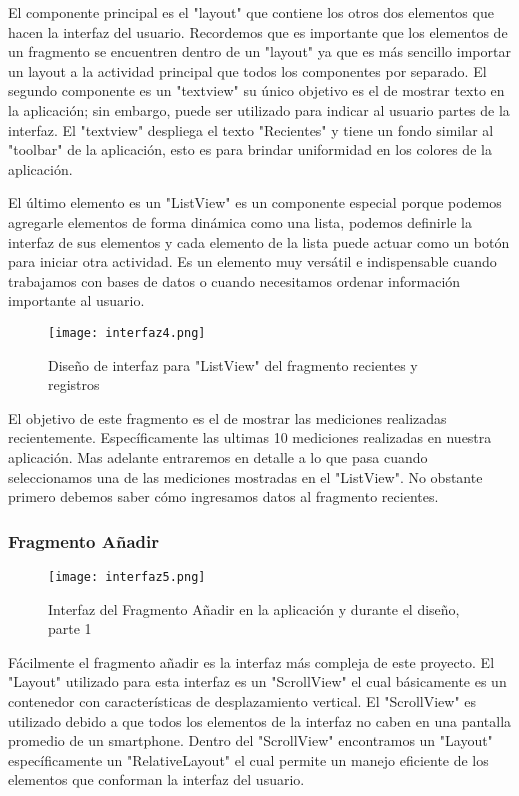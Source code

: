 \par \noindent
El componente principal es el "layout" que contiene los otros dos elementos que hacen la interfaz del usuario. Recordemos que es importante que los elementos de un fragmento se encuentren dentro de un "layout" ya que es más sencillo importar un layout a la actividad principal que todos los componentes por separado. El segundo componente es un "textview" su único objetivo es el de mostrar texto en la aplicación; sin embargo, puede ser utilizado para indicar al usuario partes de la interfaz. El "textview" despliega el texto "Recientes" y tiene un fondo similar al "toolbar" de la aplicación, esto es para brindar uniformidad en los colores de la aplicación. 

\par \noindent
El último elemento es un "ListView" es un componente especial porque podemos agregarle elementos de forma dinámica como una lista, podemos definirle la interfaz de sus elementos y cada elemento de la lista puede actuar como un botón para iniciar otra actividad. Es un elemento muy versátil e indispensable cuando trabajamos con bases de datos o cuando necesitamos ordenar información importante al usuario.

\begin{figure}[H]
	\centering
	\texttt{[image: interfaz4.png]}
	\caption{Diseño de interfaz para "ListView" del fragmento recientes y registros}
\end{figure}

\par \noindent
El objetivo de este fragmento es el de mostrar las mediciones realizadas recientemente. Específicamente las ultimas 10 mediciones realizadas en nuestra aplicación. Mas adelante entraremos en detalle a lo que pasa cuando seleccionamos una de las mediciones mostradas en el "ListView". No obstante primero debemos saber cómo ingresamos datos al fragmento recientes. 

\subsubsection{Fragmento Añadir}

\begin{figure}[H]
	\centering
	\texttt{[image: interfaz5.png]}
	\caption{Interfaz del Fragmento Añadir en la aplicación y durante el diseño, parte 1}
\end{figure}

\par 
Fácilmente el fragmento añadir es la interfaz más compleja de este proyecto. El "Layout" utilizado para esta interfaz es un "ScrollView" el cual básicamente es un contenedor con características de desplazamiento vertical. El "ScrollView" es utilizado debido a que todos los elementos de la interfaz no caben en una pantalla promedio de un smartphone. Dentro del "ScrollView" encontramos un "Layout" específicamente un "RelativeLayout" el cual permite un manejo eficiente de los elementos que conforman la interfaz del usuario. 

